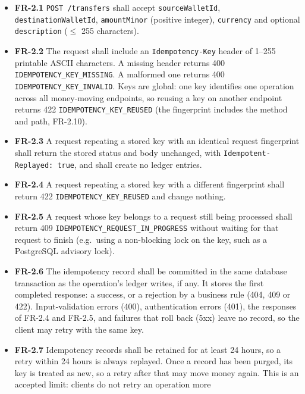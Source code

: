 \documentclass[11pt,a4paper]{article}
\providecommand{\tightlist}{\setlength{\itemsep}{2pt}\setlength{\parskip}{0pt}}
\begin{document}
\begin{itemize}
\tightlist
\item
  \textbf{FR-2.1} \texttt{POST\ /\allowbreak{}transfers} shall accept \texttt{sourceWalletId}, \texttt{destinationWalletId}, \texttt{amountMinor}
  (positive integer), \texttt{currency} and optional \texttt{description} (\ensuremath{\le} 255 characters).
\item
  \textbf{FR-2.2} The request shall include an \texttt{Idempotency-Key} header of 1--255 printable ASCII
  characters. A missing header returns 400 \texttt{IDEMPOTENCY\_\allowbreak{}KEY\_\allowbreak{}MISSING}. A malformed one returns 400
  \texttt{IDEMPOTENCY\_\allowbreak{}KEY\_\allowbreak{}INVALID}. Keys are global: one key identifies one operation across all
  money-moving endpoints, so reusing a key on another endpoint returns 422
  \texttt{IDEMPOTENCY\_\allowbreak{}KEY\_\allowbreak{}REUSED} (the fingerprint includes the method and path, FR-2.10).
\item
  \textbf{FR-2.3} A request repeating a stored key with an identical request fingerprint shall return
  the stored status and body unchanged, with \texttt{Idempotent-Replayed:\ true}, and shall create no
  ledger entries.
\item
  \textbf{FR-2.4} A request repeating a stored key with a different fingerprint shall return 422
  \texttt{IDEMPOTENCY\_\allowbreak{}KEY\_\allowbreak{}REUSED} and change nothing.
\item
  \textbf{FR-2.5} A request whose key belongs to a request still being processed shall return 409
  \texttt{IDEMPOTENCY\_\allowbreak{}REQUEST\_\allowbreak{}IN\_\allowbreak{}PROGRESS} without waiting for that request to finish (e.g.~using a
  non-blocking lock on the key, such as a PostgreSQL advisory lock).
\item
  \textbf{FR-2.6} The idempotency record shall be committed in the same database transaction as the
  operation's ledger writes, if any. It stores the first completed response: a success, or a
  rejection by a business rule (404, 409 or 422). Input-validation errors (400), authentication
  errors (401), the responses of FR-2.4 and FR-2.5, and failures that roll back (5xx) leave no
  record, so the client may retry with the same key.
\item
  \textbf{FR-2.7} Idempotency records shall be retained for at least 24 hours, so a retry within 24 hours
  is always replayed. Once a record has been purged, its key is treated as new, so a retry after
  that may move money again. This is an accepted limit: clients do not retry an operation more

\end{itemize}
\end{document}
